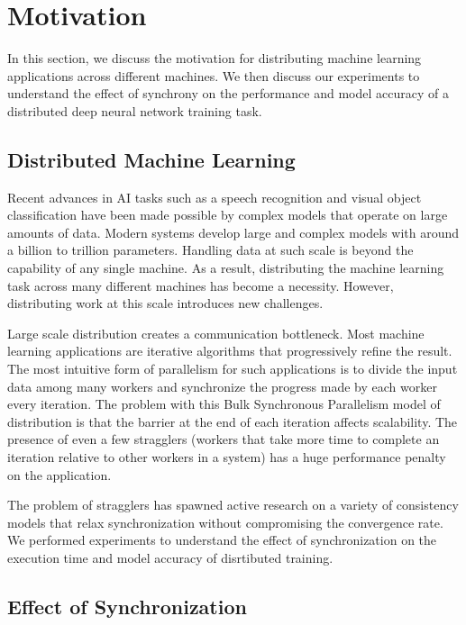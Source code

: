 \section{Motivation} \label{sec:motivation}

In this section, we discuss the motivation for distributing
machine learning applications across different machines.
We then discuss our experiments to understand the effect of
synchrony on the performance and model accuracy of a distributed
deep neural network training task.

\subsection{Distributed Machine Learning}

Recent advances in AI tasks such as a speech recognition and visual 
object classification have been made possible by complex models
that operate on large amounts of data. Modern systems \cite{distbelief}
\cite{projectadam}\cite{parameterserver} develop large and complex
models with around a billion to trillion parameters. Handling data
at such scale is beyond the capability of any single machine. As a 
result, distributing the machine learning task across many different
machines has become a necessity. However, distributing work at 
this scale introduces new challenges.

Large scale distribution creates a communication bottleneck. Most 
machine learning applications are iterative algorithms that progressively
refine the result. The most intuitive form of parallelism for such 
applications is to divide the input data among many workers and 
synchronize the progress made by each worker every iteration. The 
problem with this Bulk Synchronous Parallelism model of distribution 
is that the barrier at the end of each iteration affects scalability.
The presence of even a few stragglers (workers that take more time
to complete an iteration relative to other workers in a system) 
has a huge performance penalty on the application.

The problem of stragglers has spawned active research on a variety
of consistency models that relax synchronization without compromising
the convergence rate\cite{communicationthesis}\cite{ganger}.
We performed experiments to understand the effect of synchronization 
on the execution time and model accuracy of disrtibuted training.

\subsection{Effect of Synchronization}

